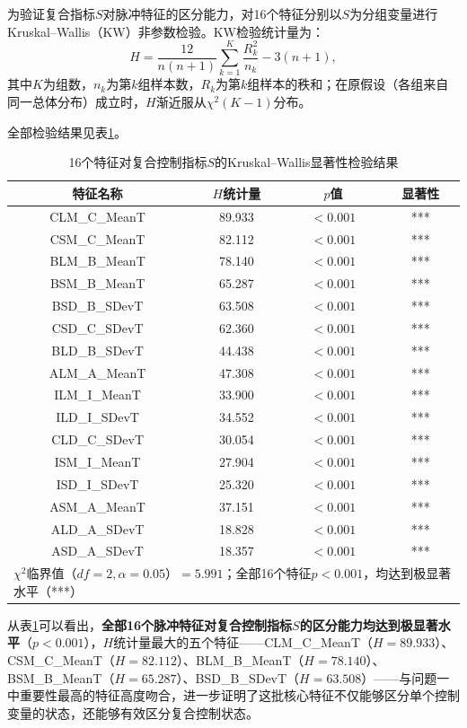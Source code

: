 \documentclass[UTF8,a4paper,12pt]{ctexart}
\begin{document}
为验证复合指标$S$对脉冲特征的区分能力，对16个特征分别以$S$为分组变量进行Kruskal--Wallis（KW）非参数检验。KW检验统计量为：
\begin{equation}
H=\frac{12}{n(n+1)}\sum_{k=1}^{K}\frac{R_k^2}{n_k}-3(n+1),
\end{equation}
其中$K$为组数，$n_k$为第$k$组样本数，$R_k$为第$k$组样本的秩和；在原假设（各组来自同一总体分布）成立时，$H$渐近服从$\chi^2(K-1)$分布。

全部检验结果见表\ref{tab:kw-full}。

\begin{table}[H]
\centering
\caption{16个特征对复合控制指标$S$的Kruskal--Wallis显著性检验结果}
\label{tab:kw-full}
\begin{tabular}{cccc}
\toprule
特征名称 & $H$统计量 & $p$值 & 显著性 \\
\midrule
CLM\_C\_MeanT & 89.933 & $<0.001$ & *** \\
CSM\_C\_MeanT & 82.112 & $<0.001$ & *** \\
BLM\_B\_MeanT & 78.140 & $<0.001$ & *** \\
BSM\_B\_MeanT & 65.287 & $<0.001$ & *** \\
BSD\_B\_SDevT & 63.508 & $<0.001$ & *** \\
CSD\_C\_SDevT & 62.360 & $<0.001$ & *** \\
BLD\_B\_SDevT & 44.438 & $<0.001$ & *** \\
ALM\_A\_MeanT & 47.308 & $<0.001$ & *** \\
ILM\_I\_MeanT & 33.900 & $<0.001$ & *** \\
ILD\_I\_SDevT & 34.552 & $<0.001$ & *** \\
CLD\_C\_SDevT & 30.054 & $<0.001$ & *** \\
ISM\_I\_MeanT & 27.904 & $<0.001$ & *** \\
ISD\_I\_SDevT & 25.320 & $<0.001$ & *** \\
ASM\_A\_MeanT & 37.151 & $<0.001$ & *** \\
ALD\_A\_SDevT & 18.828 & $<0.001$ & *** \\
ASD\_A\_SDevT & 18.357 & $<0.001$ & *** \\
\midrule
\multicolumn{4}{l}{\footnotesize$\chi^2$临界值（$df=2,\alpha=0.05$）$=5.991$；全部16个特征$p<0.001$，均达到极显著水平（***）} \\
\bottomrule
\end{tabular}
\end{table}

从表\ref{tab:kw-full}可以看出，\textbf{全部16个脉冲特征对复合控制指标$S$的区分能力均达到极显著水平}（$p<0.001$），$H$统计量最大的五个特征——CLM\_C\_MeanT（$H=89.933$）、CSM\_C\_MeanT（$H=82.112$）、BLM\_B\_MeanT（$H=78.140$）、BSM\_B\_MeanT（$H=65.287$）、BSD\_B\_SDevT（$H=63.508$）——与问题一中重要性最高的特征高度吻合，进一步证明了这批核心特征不仅能够区分单个控制变量的状态，还能够有效区分复合控制状态。
\end{document}
